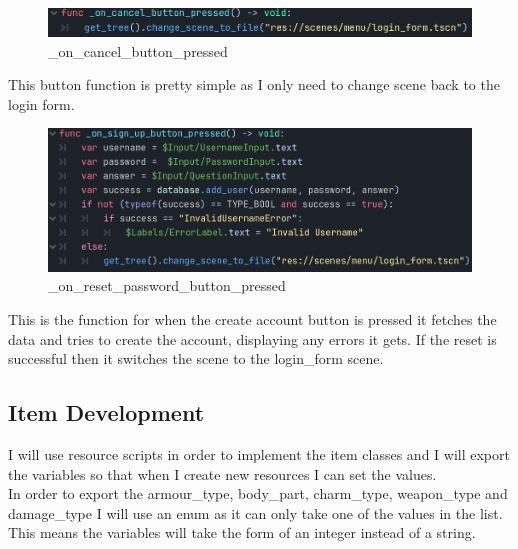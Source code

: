\documentclass{article}
\begin{document}
        \[\]
        \begin{figure}[H]
              \centering
              \includegraphics{images/development/CreateAccountForm_cancel.PNG}
              \caption{\_on\_cancel\_button\_pressed}
        \end{figure}
        This button function is pretty simple as I only need to change scene back to the login form.\\
        \begin{figure}[H]
                \centering
                \includegraphics{images/development/CreateAccountForm_create.PNG}
                \caption{\_on\_reset\_password\_button\_pressed}
        \end{figure}
        \[\]
        This is the function for when the create account button is pressed it fetches the data and tries to create the account, displaying any errors it gets. If the reset is successful then it switches the scene to the login\_form scene.\\
        
        \newpage
        \subsection{Item Development}
        I will use resource scripts in order to implement the item classes and I will export the variables so that when I create new resources I can set the values.\\
        In order to export the armour\_type, body\_part, charm\_type, weapon\_type and damage\_type I will use an enum as it can only take one of the values in the list. This means the variables will take the form of an integer instead of a string.\\
\end{document}
